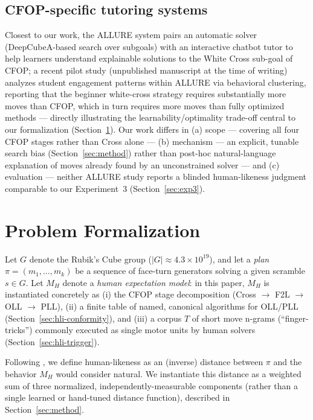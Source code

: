\documentclass[10pt,conference]{article}
\begin{document}
\subsection{CFOP-specific tutoring systems}
Closest to our work, the ALLURE system \citep{allure} pairs an
automatic solver (DeepCubeA-based search over subgoals) with an
interactive chatbot tutor to help learners understand explainable
solutions to the White Cross sub-goal of CFOP; a recent pilot study
\citep{vanacore2025} (unpublished manuscript at the time of writing)
analyzes student engagement patterns within ALLURE via behavioral
clustering, reporting that the beginner white-cross strategy
requires substantially more moves than CFOP, which in turn requires
more moves than fully optimized methods --- directly
illustrating the learnability/optimality trade-off central to our
formalization (Section~\ref{sec:formalization}). Our work differs in
(a) scope --- covering all four CFOP stages rather than Cross alone
--- (b) mechanism --- an explicit, tunable search bias
(Section~\ref{sec:method}) rather than post-hoc natural-language
explanation of moves already found by an unconstrained solver ---
and (c) evaluation --- neither ALLURE study reports a blinded
human-likeness judgment comparable to our Experiment~3
(Section~\ref{sec:exp3}).

\section{Problem Formalization}
\label{sec:formalization}

Let $G$ denote the Rubik's Cube group ($|G| \approx 4.3 \times
10^{19}$), and let a \emph{plan} $\pi = (m_1, \ldots, m_k)$ be a
sequence of face-turn generators solving a given scramble $s \in G$.
Let $M_H$ denote a \emph{human expectation model}: in this paper,
$M_H$ is instantiated concretely as (i) the CFOP stage decomposition
(Cross $\to$ F2L $\to$ OLL $\to$ PLL), (ii) a finite table of named,
canonical algorithms for OLL/PLL (Section~\ref{sec:hli-conformity}),
and (iii) a corpus $T$ of short move n-grams (``finger-tricks'')
commonly executed as single motor units by human solvers
(Section~\ref{sec:hli-trigger}).

Following \citet{kulkarni2016}, we define human-likeness as an
(inverse) distance between $\pi$ and the behavior $M_H$ would
consider natural. We instantiate this distance as a weighted sum of
three normalized, independently-measurable components (rather than a
single learned or hand-tuned distance function), described in
Section~\ref{sec:method}.
\end{document}
